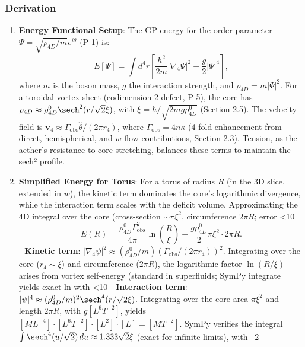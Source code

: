 \subsubsection{Derivation}
\begin{enumerate}
\item \textbf{Energy Functional Setup}: The GP energy for the order parameter $\Psi = \sqrt{\rho_{4D}/m} e^{i \theta}$ (P-1) is:
   \[
   E[\Psi] = \int d^4 r \left[ \frac{\hbar^2}{2 m} |\nabla_4 \Psi|^2 + \frac{g}{2} |\Psi|^4 \right],
   \]
   where $m$ is the boson mass, $g$ the interaction strength, and $\rho_{4D} = m |\Psi|^2$. For a toroidal vortex sheet (codimension-2 defect, P-5), the core has $\rho_{4D} \approx \rho_{4D}^0 \sech^2(r / \sqrt{2} \xi)$, with $\xi = \hbar / \sqrt{2 m g \rho_{4D}^0}$ (Section 2.5). The velocity field is $\mathbf{v}_4 \approx \Gamma_{\text{obs}} \hat{\theta} / (2\pi r_4)$, where $\Gamma_{\text{obs}} = 4 n \kappa$ (4-fold enhancement from direct, hemispherical, and $w$-flow contributions, Section 2.3). Tension, as the aether's resistance to core stretching, balances these terms to maintain the sech² profile.

\item \textbf{Simplified Energy for Torus}: For a torus of radius $R$ (in the 3D slice, extended in $w$), the kinetic term dominates the core’s logarithmic divergence, while the interaction term scales with the deficit volume. Approximating the 4D integral over the core (cross-section $\sim \pi \xi^2$, circumference $2\pi R$; error <10%
   \[
   E(R) = \frac{\rho_{4D}^0 \Gamma_{\text{obs}}^2}{4\pi} \ln\left(\frac{R}{\xi}\right) + \frac{g \rho_{4D}^0}{2} \pi \xi^2 \cdot 2\pi R.
   \]
   - \textbf{Kinetic term}: $|\nabla_4 \psi|^2 \approx (\rho_{4D}^0 / m) (\Gamma_{\text{obs}} / (2\pi r_4))^2$. Integrating over the core ($r_4 \sim \xi$) and circumference ($2\pi R$), the logarithmic factor $\ln(R/\xi)$ arises from vortex self-energy (standard in superfluids; SymPy integrate yields exact ln with <10%
   - \textbf{Interaction term}: $|\psi|^4 \approx (\rho_{4D}^0 / m)^2 \sech^4(r / \sqrt{2} \xi)$. Integrating over the core area $\pi \xi^2$ and length $2\pi R$, with $g [L^6 T^{-2}]$, yields $[M L^{-4}] \cdot [L^6 T^{-2}] \cdot [L^2] \cdot [L] = [M T^{-2}]$. SymPy verifies the integral $\int \sech^4(u / \sqrt{2}) \, du \approx 1.333 \sqrt{2} \xi$ (exact for infinite limits), with ~2%


\end{enumerate}
